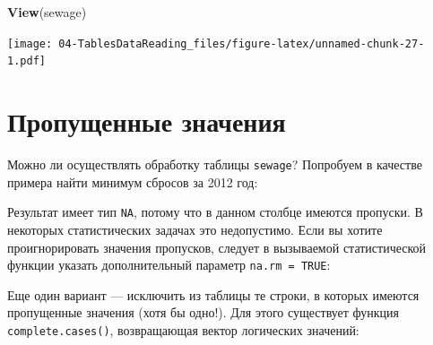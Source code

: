 \documentclass[]{book}
\newenvironment{Shaded}{\begin{snugshade}}{\end{snugshade}}
\newcommand{\KeywordTok}[1]{\textcolor[rgb]{0.13,0.29,0.53}{\textbf{#1}}}
\newcommand{\DataTypeTok}[1]{\textcolor[rgb]{0.13,0.29,0.53}{#1}}
\newcommand{\OtherTok}[1]{\textcolor[rgb]{0.56,0.35,0.01}{#1}}
\newcommand{\OperatorTok}[1]{\textcolor[rgb]{0.81,0.36,0.00}{\textbf{#1}}}
\newcommand{\NormalTok}[1]{#1}
\begin{document}
\begin{Shaded}
\begin{Highlighting}[]
\KeywordTok{View}\NormalTok{(sewage)}
\end{Highlighting}
\end{Shaded}

\texttt{[image: 04-TablesDataReading\_files/figure-latex/unnamed-chunk-27-1.pdf]}

\section{Пропущенные значения}\label{missed_values}

Можно ли осуществлять обработку таблицы \texttt{sewage}? Попробуем в
качестве примера найти минимум сбросов за 2012 год:

\begin{Shaded}
\end{Shaded}

Результат имеет тип \texttt{NA}, потому что в данном столбце имеются
пропуски. В некоторых статистических задачах это недопустимо. Если вы
хотите проигнорировать значения пропусков, следует в вызываемой
статистической функции указать дополнительный параметр
\texttt{na.rm\ =\ TRUE}:

\begin{Shaded}
\end{Shaded}

Еще один вариант --- исключить из таблицы те строки, в которых имеются
пропущенные значения (хотя бы одно!). Для этого существует функция
\texttt{complete.cases()}, возвращающая вектор логических значений:
\end{document}
